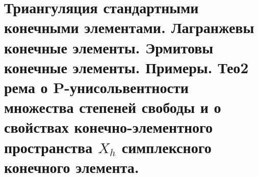 \documentclass[__main__.tex]{subfiles}
\begin{document}
\section{Триангуляция стандартными конечными элементами. Лагранжевы конечные элементы. Эрмитовы конечные элементы. Примеры. Тео2 рема о P-унисольвентности множества степеней свободы и о свойствах конечно-элементного пространства $X_h$ симплексного конечного элемента.}
\end{document}
